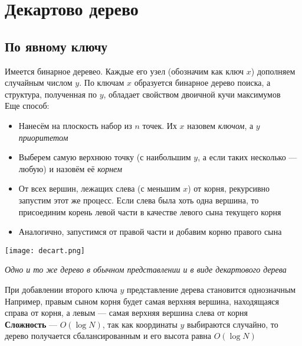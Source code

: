 \documentclass[a4paper]{article}
\begin{document}
\section{Декартово дерево}
\subsection{По явному ключу}
Имеется бинарное деревео. Каждые его узел (обозначим как ключ $x$) дополняем случайным числом $y$. По ключам $x$ образуется бинарное дерево поиска, а структура, полученная по $y$, обладает свойством двоичной кучи максимумов\\[2mm]
\indent Еще способ:
\begin{itemize}
    \item Нанесём на плоскость набор из $n$ точек. Их $x$ назовем \textit{ключом}, а $y$ \textit{приоритетом}
    \item Выберем самую верхнюю точку (с наибольшим $y$, а если таких несколько — любую) и назовём её \textit{корнем}
    \item От всех вершин, лежащих слева (с меньшим $x$) от корня, рекурсивно запустим этот же процесс. Если слева была хоть одна вершина, то присоединим корень левой части в качестве левого сына текущего корня
    \item Аналогично, запустимся от правой части и добавим корню правого сына
\end{itemize}
\begin{center}
    \texttt{[image: decart.png]}
    \label{decart}
\end{center}
\begin{center}
    \textit{Одно и то же дерево в обычном представлении и в виде декартового дерева}
\end{center}
При добавлении второго ключа $y$ представление дерева становится однозначным\\[2mm]
Например, правым сыном корня будет самая верхняя вершина, находящаяся справа от корня, а левым — самая верхняя вершина слева от корня\\[2mm]
\indent\textbf{Сложность} — $O(\log N)$, так как координаты $y$ выбираются случайно, то дерево получается сбалансированным и его высота равна $O(\log N)$
\end{document}
